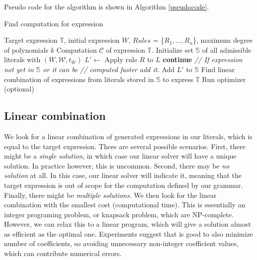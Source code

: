 Pseudo code for the algorithm is shown in Algorithm \ref{pseudocode}.

\begin{algorithm}
\caption{Find computation for expression}
\begin{algorithmic} 
\REQUIRE Target expression $\mathbb{T}$, initial expression $W$, $Rules$ = \{$R_1, \dots, R_n$\}, maximum degree of polynomials $k$
\ENSURE Computation $\mathcal{C}$ of expression $\mathbb{T}$.
\STATE Initialize set $\mathbb{S}$ of all admissible literals with $(W, \mathcal{W}, t_W)$
\STATE $L' \gets$ Apply rule $R$ to $L$
  \STATE \textbf{continue}
\ENDIF
\STATE \emph{// If expression not yet in $\mathbb{S}$ or it can be}
\STATE \emph{// computed faster add it.}
  \STATE Add $L'$ to $\mathbb{S}$
\ENDIF
\ENDFOR
\ENDFOR
\ENDWHILE
\STATE Find linear combination of expressions from literals stored in $\mathbb{S}$ to express $\mathbb{T}$
\STATE Run optimizer (optional)
\end{algorithmic}
\label{pseudocode}
\end{algorithm}


\subsection{Linear combination}
\label{sec:linear}
We look for a linear combination of generated expressions in our
literals, which is equal to the target expression. There are several
possible scenarios. First, there might be a \emph{single solution}, in
which case our linear solver will have a unique solution. In practice
however, this is uncommon. Second, there may be \emph{no solution} at
all.  In this case, our linear solver will indicate it, meaning that
the target expression is out of scope for the computation defined by
our grammar. Finally, there might be \emph{multiple solutions}. We
then look for the linear combination with the smallest cost
(computational time).  This is essentially an integer programing
problem, or knapsack problem, which are NP-complete. However, we can
relax this to a linear program, which will give a solution almost as
efficient as the optimal one.  Experiments suggest that is good to
also minimize number of coefficients, so avoiding unnecessary
non-integer coefficient values, which can contribute numerical errors.



